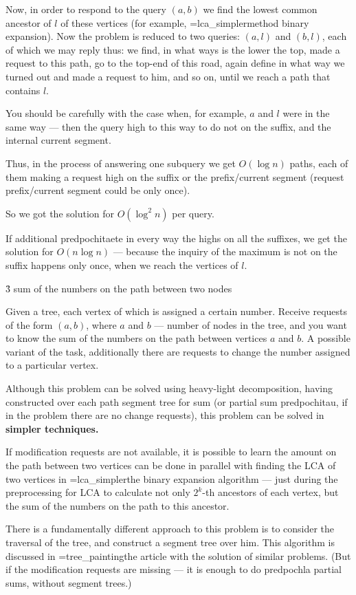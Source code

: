Now, in order to respond to the query $(a,b)$ we find the lowest common ancestor of $l$ of these vertices (for example, \algohref=lca_simpler{method binary expansion}). Now the problem is reduced to two queries: $(a,l)$ and $(b,l)$, each of which we may reply thus: we find, in what ways is the lower the top, made a request to this path, go to the top-end of this road, again define in what way we turned out and made a request to him, and so on, until we reach a path that contains $l$.

You should be carefully with the case when, for example, $a$ and $l$ were in the same way --- then the query high to this way to do not on the suffix, and the internal current segment.

Thus, in the process of answering one subquery we get $O (\log n)$ paths, each of them making a request high on the suffix or the prefix/current segment (request prefix/current segment could be only once).

So we got the solution for $O (\log^2 n)$ per query.

If additional predpochitaete in every way the highs on all the suffixes, we get the solution for $O (n \log n)$ --- because the inquiry of the maximum is not on the suffix happens only once, when we reach the vertices of $l$.


\h3{ sum of the numbers on the path between two nodes }

Given a tree, each vertex of which is assigned a certain number. Receive requests of the form $(a,b)$, where $a$ and $b$ --- number of nodes in the tree, and you want to know the sum of the numbers on the path between vertices $a$ and $b$. A possible variant of the task, additionally there are requests to change the number assigned to a particular vertex.

Although this problem can be solved using heavy-light decomposition, having constructed over each path segment tree for sum (or partial sum predpochitau, if in the problem there are no change requests), this problem can be solved in \bf{simpler techniques}.

If modification requests are not available, it is possible to learn the amount on the path between two vertices can be done in parallel with finding the LCA of two vertices in \algohref=lca_simpler{the binary expansion algorithm} --- just during the preprocessing for LCA to calculate not only $2^k$-th ancestors of each vertex, but the sum of the numbers on the path to this ancestor.

There is a fundamentally different approach to this problem is to consider the traversal of the tree, and construct a segment tree over him. This algorithm is discussed in \algohref=tree_painting{the article with the solution of similar problems}. (But if the modification requests are missing --- it is enough to do predpochla partial sums, without segment trees.)

